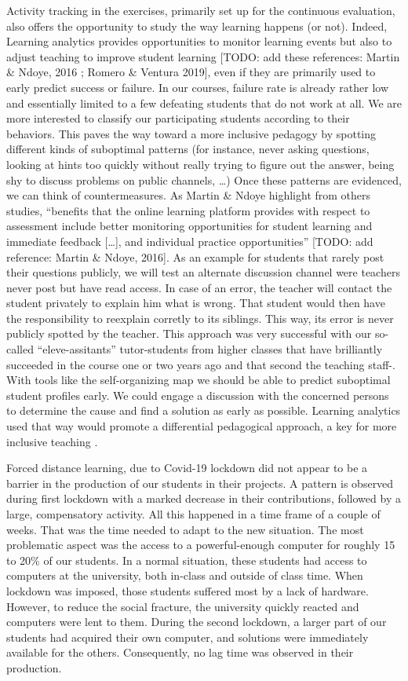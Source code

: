 \documentclass{aims}
\theoremstyle{definition}
\begin{document}
Activity tracking in the exercises, primarily set up for the continuous
evaluation, also offers the opportunity to study the way learning
happens (or not). Indeed, Learning analytics provides opportunities to
monitor learning events but also to adjust teaching to improve student
learning {[}TODO: add these references: Martin \& Ndoye, 2016 ; Romero
\& Ventura 2019{]}, even if they are primarily used to early predict
success or failure. In our courses, failure rate is already rather low
and essentially limited to a few defeating students that do not work at
all. We are more interested to classify our participating students
according to their behaviors. This paves the way toward a more inclusive
pedagogy by spotting different kinds of suboptimal patterns (for
instance, never asking questions, looking at hints too quickly without
really trying to figure out the answer, being shy to discuss problems on
public channels, \ldots) Once these patterns are evidenced, we can think
of countermeasures. As Martin \& Ndoye highlight from others studies,
``benefits that the online learning platform provides with respect to
assessment include better monitoring opportunities for student learning
and immediate feedback {[}\ldots{]}, and individual practice
opportunities'' {[}TODO: add reference: Martin \& Ndoye, 2016{]}. As an
example for students that rarely post their questions publicly, we will
test an alternate discussion channel were teachers never post but have
read access. In case of an error, the teacher will contact the student
privately to explain him what is wrong. That student would then have the
responsibility to reexplain corretly to its siblings. This way, its
error is never publicly spotted by the teacher. This approach was very
successful with our so-called ``eleve-assitants'' tutor-students from
higher classes that have brilliantly succeeded in the course one or two
years ago and that second the teaching staff-. With tools like the
self-organizing map we should be able to predict suboptimal student
profiles early. We could engage a discussion with the concerned persons
to determine the cause and find a solution as early as possible.
Learning analytics used that way would promote a differential
pedagogical approach, a key for more inclusive teaching
\cite{Siemens2013}.

Forced distance learning, due to Covid-19 lockdown did not appear to be
a barrier in the production of our students in their projects. A pattern
is observed during first lockdown with a marked decrease in their
contributions, followed by a large, compensatory activity. All this
happened in a time frame of a couple of weeks. That was the time needed
to adapt to the new situation. The most problematic aspect was the
access to a powerful-enough computer for roughly 15 to 20\% of our
students. In a normal situation, these students had access to computers
at the university, both in-class and outside of class time. When
lockdown was imposed, those students suffered most by a lack of
hardware. However, to reduce the social fracture, the university quickly
reacted and computers were lent to them. During the second lockdown, a
larger part of our students had acquired their own computer, and
solutions were immediately available for the others. Consequently, no
lag time was observed in their production.
\end{document}
